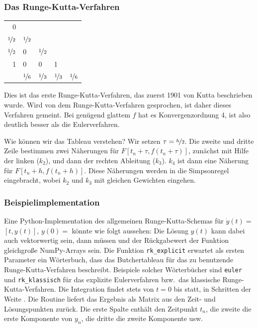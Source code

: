 \subsubsection{Das Runge-Kutta-Verfahren}

\begin{center}
  \renewcommand{\arraystretch}{1.3}
  \begin{tabular}{r|llll}
    0 & \\
    $\nicefrac{1}{2}$ & $\nicefrac{1}{2}$ \\
    $\nicefrac{1}{2}$ & 0 & $\nicefrac{1}{2}$ \\
    1 & 0 & 0 & 1 \\
    \hline
    & $\nicefrac{1}{6}$ &  $\nicefrac{1}{3}$ & 
    $\nicefrac{1}{3}$ &  $\nicefrac{1}{6}$
  \end{tabular}
\end{center}

Dies ist das erste Runge-Kutta-Verfahren, das zuerst 1901 von Kutta
beschrieben wurde. Wird von dem Runge-Kutta-Verfahren gesprochen, ist
daher dieses Verfahren gemeint. Bei genügend glattem $f$ hat es
Konvergenzordnung 4, ist also deutlich besser als die Eulerverfahren.

Wie können wir das Tableau verstehen?  Wir setzen
$\tau=\nicefrac{h}{2}$. Die zweite und dritte Zeile bestimmen zwei
Näherungen für $F[t_n+\tau, f(t_n+\tau)]$, zunächst mit Hilfe der
linken ($k_2$), und dann der rechten Ableitung ($k_3$). $k_4$ ist dann
eine Näherung für $F[t_n+h, f(t_n+h)]$. Diese Näherungen werden in die
Simpsonregel eingebracht, wobei $k_2$ und $k_3$ mit gleichen Gewichten
eingehen.

\subsubsection{Beispielimplementation}

Eine Python-Implementation des allgemeinen Runge-Kutta-Schemas für
$\dot y(t) = $$[t, y(t)]$, $y(0) =$  könnte wie folgt
aussehen:%
%
Die Lösung $y(t)$ kann dabei auch vektorwertig sein, dann müssen
 und der Rückgabewert der Funktion  gleichgroße
NumPy-Arrays sein. Die Funktion \lstinline!rk_explicit! erwartet als
ersten Parameter ein Wörterbuch, dass das Butchertableau für das zu
benutzende Runge-Kutta-Verfahren beschreibt. Beispiele solcher
Wörterbücher sind \lstinline!euler! und \lstinline!rk_klassisch! für
das explizite Eulerverfahren bzw.\ das klassische
Runge-Kutta-Verfahren. Die Integration findet stets von $t=0$ bis
 statt, in Schritten der Weite . Die Routine
liefert das Ergebnis als Matrix aus den Zeit- und Lösungspunkten
zurück. Die erste Spalte enthält den Zeitpunkt $t_n$, die zweite die
erste Komponente von $y_n$, die dritte die zweite Komponente usw.

